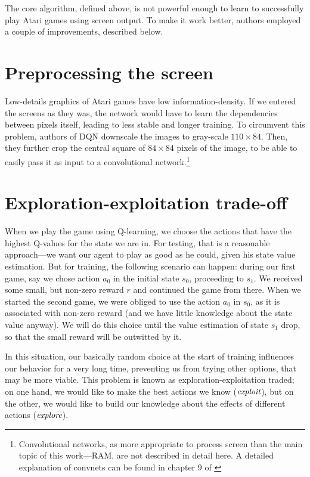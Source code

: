 The core algorithm, defined above, is not powerful enough to learn to successfully play Atari games using screen output. To make it work better, authors employed a couple of improvements, described below.

\section{Preprocessing the screen}
Low-details graphics of Atari games have low information-density. If we entered the screens as they was, the network would have to learn the dependencies between pixels itself, leading to less stable and longer training. To circumvent this problem, authors of DQN downscale the images to gray-scale $110 \times 84$. Then, they further crop the central square of $84 \times 84$ pixels of the image, to be able to easily pass it as input to a convolutional network.\footnote{Convolutional networks, as more appropriate to process screen than the main topic of this work---RAM, are not described in detail here. A detailed explanation of convnets can be found in chapter 9 of \cite{dlbook}}
\section{Exploration-exploitation trade-off}
When we play the game using Q-learning, we choose the actions that have the highest Q-values for the state we are in. For testing, that is a reasonable approach---we want our agent to play as good as he could, given his state value estimation. But for training, the following scenario can happen: during our first game, say we chose action $a_0$ in the initial state $s_0$, proceeding to $s_1$. We received some small, but non-zero reward $r$ and continued the game from there. When we started the second game, we were obliged to use the action $a_0$ in $s_0$, as it is associated with non-zero reward (and we have little knowledge about the state value anyway). We will do this choice until the value estimation of state $s_1$ drop, so that the small reward will be outwitted by it.

In this situation, our basically random choice at the start of training influences our behavior for a very long time, preventing us from trying other options, that may be more viable. This problem is known as exploration-exploitation traded; on one hand, we would like to make the best actions we know ($\emph{exploit}$), but on the other, we would like to build our knowledge about the effects of different actions ($\emph{explore}$).

